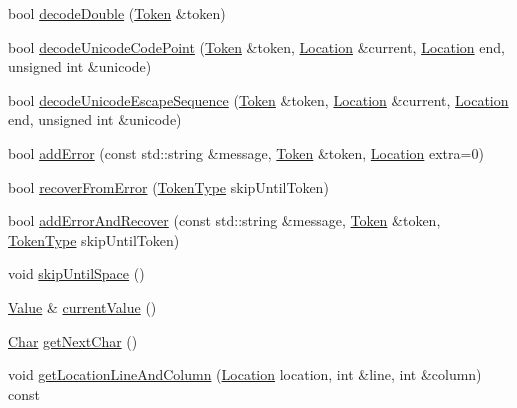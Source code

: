 \begin{DoxyCompactItemize}
\item 
bool \hyperlink{classJson_1_1Reader_a2420bbb7fd6d5d3e7e2fea894dd8f70f}{decode\-Double} (\hyperlink{classJson_1_1Reader_1_1Token}{Token} \&token)
\item 
bool \hyperlink{classJson_1_1Reader_a8fe24db3e9953aef3d637a56447e795c}{decode\-Unicode\-Code\-Point} (\hyperlink{classJson_1_1Reader_1_1Token}{Token} \&token, \hyperlink{classJson_1_1Reader_a46795b5b272bf79a7730e406cb96375a}{Location} \&current, \hyperlink{classJson_1_1Reader_a46795b5b272bf79a7730e406cb96375a}{Location} end, unsigned int \&unicode)
\item 
bool \hyperlink{classJson_1_1Reader_a469cb6f55971d7c41fca2752a3aa5bf7}{decode\-Unicode\-Escape\-Sequence} (\hyperlink{classJson_1_1Reader_1_1Token}{Token} \&token, \hyperlink{classJson_1_1Reader_a46795b5b272bf79a7730e406cb96375a}{Location} \&current, \hyperlink{classJson_1_1Reader_a46795b5b272bf79a7730e406cb96375a}{Location} end, unsigned int \&unicode)
\item 
bool \hyperlink{classJson_1_1Reader_a04a3a13dbc609dfdf9e3c6723e37ff21}{add\-Error} (const std\-::string \&message, \hyperlink{classJson_1_1Reader_1_1Token}{Token} \&token, \hyperlink{classJson_1_1Reader_a46795b5b272bf79a7730e406cb96375a}{Location} extra=0)
\item 
bool \hyperlink{classJson_1_1Reader_a8d4ed03a43082c5ace81ba5b81425eaf}{recover\-From\-Error} (\hyperlink{classJson_1_1Reader_aa35e6ab574dc399a0a645ad98ed66bc9}{Token\-Type} skip\-Until\-Token)
\item 
bool \hyperlink{classJson_1_1Reader_af47fb7564db6ac21faebaba8cebb41ce}{add\-Error\-And\-Recover} (const std\-::string \&message, \hyperlink{classJson_1_1Reader_1_1Token}{Token} \&token, \hyperlink{classJson_1_1Reader_aa35e6ab574dc399a0a645ad98ed66bc9}{Token\-Type} skip\-Until\-Token)
\item 
void \hyperlink{classJson_1_1Reader_ad922ea5a8ab333084edbb84827861fa3}{skip\-Until\-Space} ()
\item 
\hyperlink{classJson_1_1Value}{Value} \& \hyperlink{classJson_1_1Reader_a1cab5c0f13de764be705d636701ffbad}{current\-Value} ()
\item 
\hyperlink{classJson_1_1Reader_a3eec9118f3e9a672ba8348c3a79d0f45}{Char} \hyperlink{classJson_1_1Reader_a2e310761d1ccef53e8b78b5d78d6659b}{get\-Next\-Char} ()
\item 
void \hyperlink{classJson_1_1Reader_a20b3023dc422726e2e4ebe41b8ba0515}{get\-Location\-Line\-And\-Column} (\hyperlink{classJson_1_1Reader_a46795b5b272bf79a7730e406cb96375a}{Location} location, int \&line, int \&column) const 

\end{DoxyCompactItemize}
